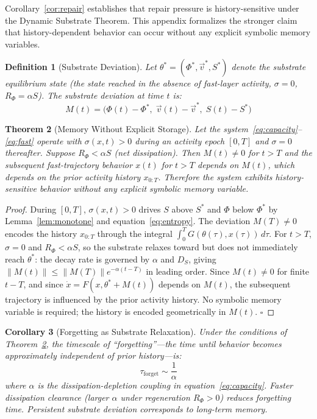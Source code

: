 \documentclass[12pt,a4paper]{article}
\newtheorem{theorem}{Theorem}[section]
\newtheorem{corollary}[theorem]{Corollary}
\newtheorem{definition}[theorem]{Definition}
\begin{document}
Corollary~\ref{cor:repair} establishes that repair pressure is history-sensitive under the Dynamic Substrate Theorem. This appendix formalizes the stronger claim that history-dependent behavior can occur without any explicit symbolic memory variables.

\begin{definition}[Substrate Deviation]
Let $\theta^* = (\Phi^*, \vec{v}^*, S^*)$ denote the substrate equilibrium state (the state reached in the absence of fast-layer activity, $\sigma = 0$, $R_\Phi = \alpha S$). The \emph{substrate deviation} at time $t$ is:
\[
M(t) = \bigl(\Phi(t) - \Phi^*,\; \vec{v}(t) - \vec{v}^*,\; S(t) - S^*\bigr)
\]
\end{definition}

\begin{theorem}[Memory Without Explicit Storage]
\label{thm:memory}
Let the system~\eqref{eq:capacity}--\eqref{eq:fast} operate with $\sigma(x,t) > 0$ during an activity epoch $[0, T]$ and $\sigma = 0$ thereafter. Suppose $R_\Phi < \alpha S$ (net dissipation). Then $M(t) \neq 0$ for $t > T$ and the subsequent fast-trajectory behavior $x(t)$ for $t > T$ depends on $M(t)$, which depends on the prior activity history $x_{0:T}$. Therefore the system exhibits history-sensitive behavior without any explicit symbolic memory variable.
\end{theorem}

\begin{proof}
During $[0, T]$, $\sigma(x,t) > 0$ drives $S$ above $S^*$ and $\Phi$ below $\Phi^*$ by Lemma~\ref{lem:monotone} and equation~\eqref{eq:entropy}. The deviation $M(T) \neq 0$ encodes the history $x_{0:T}$ through the integral $\int_0^T G(\theta(\tau), x(\tau))\,d\tau$. For $t > T$, $\sigma = 0$ and $R_\Phi < \alpha S$, so the substrate relaxes toward but does not immediately reach $\theta^*$: the decay rate is governed by $\alpha$ and $D_S$, giving $\|M(t)\| \leq \|M(T)\| e^{-\alpha(t-T)}$ in leading order. Since $M(t) \neq 0$ for finite $t - T$, and since $\dot{x} = F(x, \theta^* + M(t))$ depends on $M(t)$, the subsequent trajectory is influenced by the prior activity history. No symbolic memory variable is required; the history is encoded geometrically in $M(t)$. $\square$
\end{proof}

\begin{corollary}[Forgetting as Substrate Relaxation]
\label{cor:forgetting}
Under the conditions of Theorem~\ref{thm:memory}, the timescale of ``forgetting''---the time until behavior becomes approximately independent of prior history---is:
\[
\tau_{\text{forget}} \sim \frac{1}{\alpha}
\]
where $\alpha$ is the dissipation-depletion coupling in equation~\eqref{eq:capacity}. Faster dissipation clearance (larger $\alpha$ under regeneration $R_\Phi > 0$) reduces forgetting time. Persistent substrate deviation corresponds to long-term memory.
\end{corollary}
\end{document}
